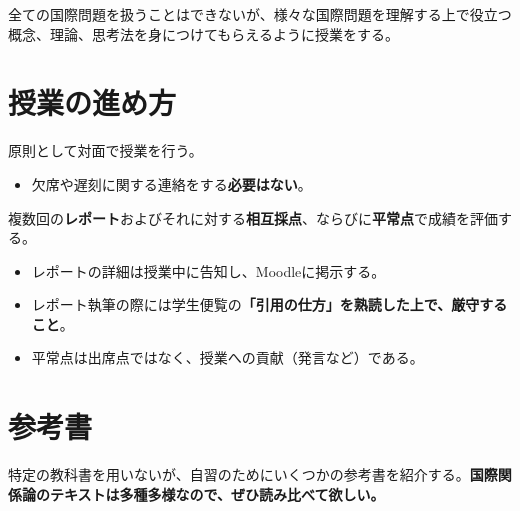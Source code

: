 \documentclass[
  xelatex,
  ja=standard]{bxjsarticle}
\providecommand{\tightlist}{%
  \setlength{\itemsep}{0pt}\setlength{\parskip}{0pt}}\usepackage{longtable,booktabs,array}
\begin{document}
\begin{tcolorbox}[enhanced jigsaw, colback=white, breakable, bottomtitle=1mm, toprule=.15mm, rightrule=.15mm, colframe=quarto-callout-warning-color-frame, opacityback=0, arc=.35mm, opacitybacktitle=0.6, bottomrule=.15mm, leftrule=.75mm, toptitle=1mm, coltitle=black, title=\textcolor{quarto-callout-warning-color}{\faExclamationTriangle}\hspace{0.5em}{カバーできないトピック}, titlerule=0mm, left=2mm, colbacktitle=quarto-callout-warning-color!10!white]

全ての国際問題を扱うことはできないが、様々な国際問題を理解する上で役立つ概念、理論、思考法を身につけてもらえるように授業をする。

\end{tcolorbox}

\hypertarget{ux6388ux696dux306eux9032ux3081ux65b9}{%
\section{授業の進め方}\label{ux6388ux696dux306eux9032ux3081ux65b9}}

原則として対面で授業を行う。

\begin{itemize}
\tightlist
\item
  欠席や遅刻に関する連絡をする\textbf{必要はない}。
\end{itemize}

複数回の\textbf{レポート}およびそれに対する\textbf{相互採点}、ならびに\textbf{平常点}で成績を評価する。

\begin{itemize}
\tightlist
\item
  レポートの詳細は授業中に告知し、Moodleに掲示する。
\item
  レポート執筆の際には学生便覧の\textbf{「引用の仕方」を熟読した上で、厳守すること}。
\item
  平常点は出席点ではなく、授業への貢献（発言など）である。
\end{itemize}

\hypertarget{ux53c2ux8003ux66f8}{%
\section{参考書}\label{ux53c2ux8003ux66f8}}

特定の教科書を用いないが、自習のためにいくつかの参考書を紹介する。\textbf{国際関係論のテキストは多種多様なので、ぜひ読み比べて欲しい。}
\end{document}
